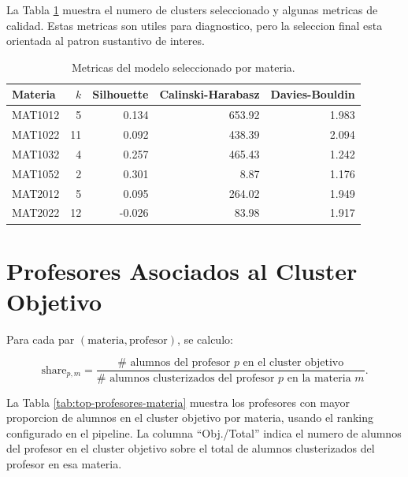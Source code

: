 \documentclass[11pt,letterpaper]{article}
\begin{document}
La Tabla \ref{tab:metricas} muestra el numero de clusters seleccionado y algunas metricas de calidad. Estas metricas son utiles para diagnostico, pero la seleccion final esta orientada al patron sustantivo de interes.

\begin{table}[H]
\centering
\small
\caption{Metricas del modelo seleccionado por materia.}
\label{tab:metricas}
\begin{tabular}{lrrrr}
\toprule
Materia & \(k\) & Silhouette & Calinski-Harabasz & Davies-Bouldin \\
\midrule
MAT1012 & 5  & 0.134  & 653.92 & 1.983 \\
MAT1022 & 11 & 0.092  & 438.39 & 2.094 \\
MAT1032 & 4  & 0.257  & 465.43 & 1.242 \\
MAT1052 & 2  & 0.301  & 8.87   & 1.176 \\
MAT2012 & 5  & 0.095  & 264.02 & 1.949 \\
MAT2022 & 12 & -0.026 & 83.98  & 1.917 \\
\bottomrule
\end{tabular}
\end{table}

\section{Profesores Asociados al Cluster Objetivo}

Para cada par \((\text{materia}, \text{profesor})\), se calculo:

\[
\text{share}_{p,m}
=
\frac{\#\text{ alumnos del profesor }p\text{ en el cluster objetivo}}
{\#\text{ alumnos clusterizados del profesor }p\text{ en la materia }m}.
\]

La Tabla \ref{tab:top-profesores-materia} muestra los profesores con mayor proporcion de alumnos en el cluster objetivo por materia, usando el ranking configurado en el pipeline. La columna ``Obj./Total'' indica el numero de alumnos del profesor en el cluster objetivo sobre el total de alumnos clusterizados del profesor en esa materia.
\end{document}
